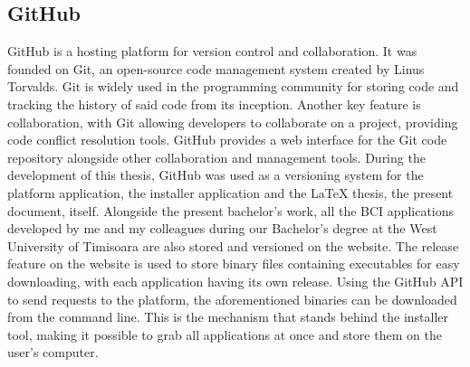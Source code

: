 \subsection{GitHub}
GitHub is a hosting platform for version control and collaboration\cite{github_HelloWorlds}. It was founded on Git, an open-source code management system created by Linus Torvalds. Git is widely used in the programming community for storing code and tracking the history of said code from its inception. Another key feature is collaboration, with Git allowing developers to collaborate on a project, providing code conflict resolution tools. GitHub provides a web interface for the Git code repository alongside other collaboration and management tools\cite{whatsGithub}. During the development of this thesis, GitHub was used as a versioning system for the platform application, the installer application and the LaTeX thesis, the present document, itself.
\vspace{\baselineskip}\newline
Alongside the present bachelor's work, all the BCI applications developed by me and my colleagues during our Bachelor's degree at the West University of Timisoara are also stored and versioned on the website. The release feature on the website is used to store binary files containing executables for easy downloading, with each application having its own release. Using the GitHub API to send requests to the platform, the aforementioned binaries can be downloaded from the command line. This is the mechanism that stands behind the installer tool, making it possible to grab all applications at once and store them on the user's computer.


